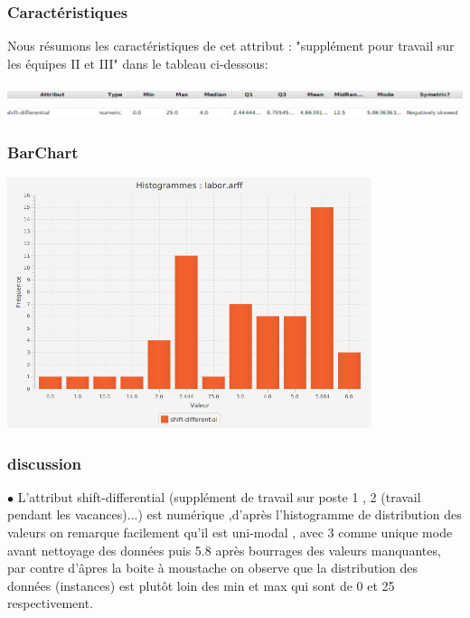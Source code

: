 \documentclass[12pt,a4paper,oneside]{book}
\begin{document}
	\subsubsection{Caractéristiques}
	Nous résumons les caractéristiques de cet attribut : "supplément pour travail sur les équipes II et III" dans le tableau ci-dessous:
	\begin{center}
		\includegraphics[width=1\textwidth]{screens/att.png}\\ \includegraphics[width=1\textwidth]{screens/att-10.png}%
		\label{labelname}%
	\end{center}
	
	\subsubsection{BarChart}
	\begin{center}
		\includegraphics[width=0.8\textwidth]{screens/barchart/shift-differential-barchart.png}%
		\label{labelname}%
	\end{center}
	
	\subsubsection{discussion}
	$\bullet$ L'attribut shift-differential (supplément de travail sur poste 1 , 2 (travail pendant les vacances)...) est numérique ,d'après l'histogramme de distribution des valeurs on remarque facilement qu'il est uni-modal , avec 3 comme unique mode avant nettoyage des données puis 5.8 après bourrages des valeurs manquantes, par contre d'âpres la boite à moustache on observe que la distribution des données (instances) est plutôt loin des min et max qui sont de 0 et 25 respectivement. \\
	
\end{document}
